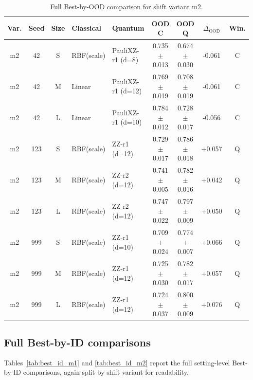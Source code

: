 \documentclass[pdflatex,sn-mathphys-num]{sn-jnl}%
\theoremstyle{thmstyleone}%
\theoremstyle{thmstyletwo}%
\theoremstyle{thmstylethree}%
\begin{document}
\begin{table}[t]
\centering
\caption{Full Best-by-OOD comparison for shift variant m2.}
\label{tab:best_ood_m2}
\scriptsize
\setlength{\tabcolsep}{3pt}
\begin{tabular}{@{}cccp{1.55cm}p{1.75cm}ccc c@{}}
\toprule
Var. & Seed & Size & Classical & Quantum & \shortstack{OOD\\C} & \shortstack{OOD\\Q} & $\Delta_{\mathrm{OOD}}$ & Win. \\
\midrule
m2 & 42  & S & RBF(scale) & PauliXZ-r1 (d=8)  & 0.735$\pm$0.013 & 0.674$\pm$0.030 & -0.061 & C \\
m2 & 42  & M & Linear     & PauliXZ-r1 (d=12) & 0.769$\pm$0.019 & 0.708$\pm$0.019 & -0.061 & C \\
m2 & 42  & L & Linear     & PauliXZ-r1 (d=10) & 0.784$\pm$0.012 & 0.728$\pm$0.017 & -0.056 & C \\
m2 & 123 & S & RBF(scale) & ZZ-r1 (d=12)      & 0.729$\pm$0.017 & 0.786$\pm$0.018 & +0.057 & Q \\
m2 & 123 & M & RBF(scale) & ZZ-r2 (d=12)      & 0.741$\pm$0.005 & 0.782$\pm$0.016 & +0.042 & Q \\
m2 & 123 & L & RBF(scale) & ZZ-r2 (d=12)      & 0.747$\pm$0.022 & 0.797$\pm$0.009 & +0.050 & Q \\
m2 & 999 & S & RBF(scale) & ZZ-r1 (d=10)      & 0.709$\pm$0.024 & 0.774$\pm$0.007 & +0.066 & Q \\
m2 & 999 & M & RBF(scale) & ZZ-r1 (d=12)      & 0.725$\pm$0.030 & 0.782$\pm$0.017 & +0.057 & Q \\
m2 & 999 & L & RBF(scale) & ZZ-r1 (d=12)      & 0.724$\pm$0.037 & 0.800$\pm$0.009 & +0.076 & Q \\
\bottomrule
\end{tabular}
\end{table}

\subsection{Full Best-by-ID comparisons}
\label{app:best_id_full}

Tables~\ref{tab:best_id_m1} and \ref{tab:best_id_m2} report the full setting-level Best-by-ID comparisons, again split by shift variant for readability.
\end{document}

